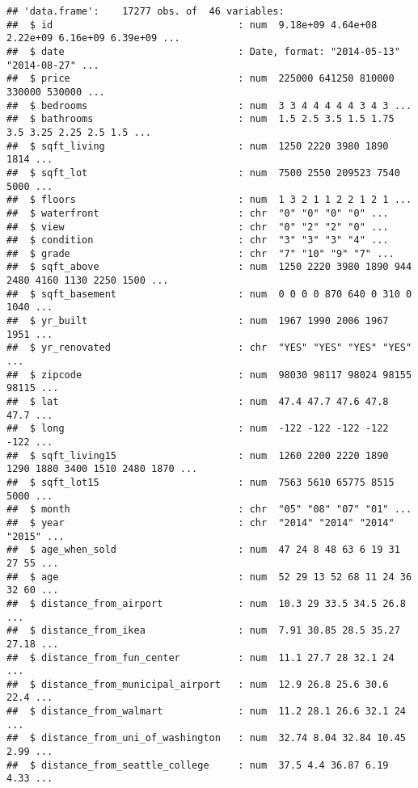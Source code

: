 \documentclass[]{article}
\begin{document}
\begin{verbatim}
## 'data.frame':    17277 obs. of  46 variables:
##  $ id                                : num  9.18e+09 4.64e+08 2.22e+09 6.16e+09 6.39e+09 ...
##  $ date                              : Date, format: "2014-05-13" "2014-08-27" ...
##  $ price                             : num  225000 641250 810000 330000 530000 ...
##  $ bedrooms                          : num  3 3 4 4 4 4 4 3 4 3 ...
##  $ bathrooms                         : num  1.5 2.5 3.5 1.5 1.75 3.5 3.25 2.25 2.5 1.5 ...
##  $ sqft_living                       : num  1250 2220 3980 1890 1814 ...
##  $ sqft_lot                          : num  7500 2550 209523 7540 5000 ...
##  $ floors                            : num  1 3 2 1 1 2 2 1 2 1 ...
##  $ waterfront                        : chr  "0" "0" "0" "0" ...
##  $ view                              : chr  "0" "2" "2" "0" ...
##  $ condition                         : chr  "3" "3" "3" "4" ...
##  $ grade                             : chr  "7" "10" "9" "7" ...
##  $ sqft_above                        : num  1250 2220 3980 1890 944 2480 4160 1130 2250 1500 ...
##  $ sqft_basement                     : num  0 0 0 0 870 640 0 310 0 1040 ...
##  $ yr_built                          : num  1967 1990 2006 1967 1951 ...
##  $ yr_renovated                      : chr  "YES" "YES" "YES" "YES" ...
##  $ zipcode                           : num  98030 98117 98024 98155 98115 ...
##  $ lat                               : num  47.4 47.7 47.6 47.8 47.7 ...
##  $ long                              : num  -122 -122 -122 -122 -122 ...
##  $ sqft_living15                     : num  1260 2200 2220 1890 1290 1880 3400 1510 2480 1870 ...
##  $ sqft_lot15                        : num  7563 5610 65775 8515 5000 ...
##  $ month                             : chr  "05" "08" "07" "01" ...
##  $ year                              : chr  "2014" "2014" "2014" "2015" ...
##  $ age_when_sold                     : num  47 24 8 48 63 6 19 31 27 55 ...
##  $ age                               : num  52 29 13 52 68 11 24 36 32 60 ...
##  $ distance_from_airport             : num  10.3 29 33.5 34.5 26.8 ...
##  $ distance_from_ikea                : num  7.91 30.85 28.5 35.27 27.18 ...
##  $ distance_from_fun_center          : num  11.1 27.7 28 32.1 24 ...
##  $ distance_from_municipal_airport   : num  12.9 26.8 25.6 30.6 22.4 ...
##  $ distance_from_walmart             : num  11.2 28.1 26.6 32.1 24 ...
##  $ distance_from_uni_of_washington   : num  32.74 8.04 32.84 10.45 2.99 ...
##  $ distance_from_seattle_college     : num  37.5 4.4 36.87 6.19 4.33 ...

\end{verbatim}
\end{document}

